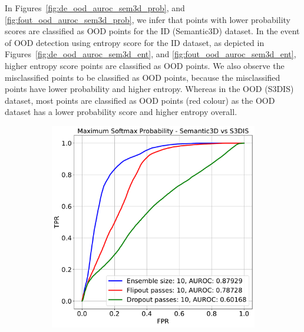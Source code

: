    In Figures~\ref{fig:de_ood_auroc_sem3d_prob}, and \ref{fig:fout_ood_auroc_sem3d_prob}, we infer that points with lower probability scores are classified as OOD points for the ID (Semantic3D) dataset.
    In the event of OOD detection using entropy score for the ID dataset, as depicted in Figures~\ref{fig:de_ood_auroc_sem3d_ent}, and \ref{fig:fout_ood_auroc_sem3d_ent}, higher entropy score points are classified as OOD points.
    We also observe the misclassified points to be classified as OOD points, because the misclassified points have lower probability and higher entropy.
    Whereas in the OOD (S3DIS) dataset, most points are classified as OOD points (red colour) as the OOD dataset has a lower probability score and higher entropy overall.
    \begin{figure}[h!]
        \begin{subfigure}{0.49\textwidth}
            \includegraphics[scale=0.32]{images/AUROC/MSP_10.pdf}
            \caption{}
            \label{fig:roc_msp_10_ood_1}
        \end{subfigure}
        \begin{subfigure}{0.495\textwidth}

\end{subfigure}
\end{figure}
